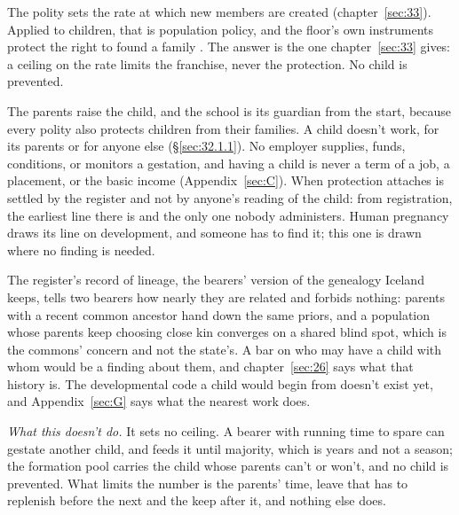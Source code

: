 The polity sets the rate at which new members are created (chapter~\ref{sec:33}). Applied to children, that is population policy, and the floor's own instruments protect the right to found a family \autocite[art.~16]{un1948udhr}. The answer is the one chapter~\ref{sec:33} gives: a ceiling on the rate limits the franchise, never the protection. No child is prevented.

The parents raise the child, and the school is its guardian from the start, because every polity also protects children from their families. A child doesn't work, for its parents or for anyone else (\S\ref{sec:32.1.1}). No employer supplies, funds, conditions, or monitors a gestation, and having a child is never a term of a job, a placement, or the basic income (Appendix~\ref{sec:C}).
When protection attaches is settled by the register and not by anyone's reading of the child: from registration, the earliest line there is and the only one nobody administers. Human pregnancy draws its line on development, and someone has to find it; this one is drawn where no finding is needed.

The register's record of lineage, the bearers' version of the genealogy Iceland keeps, tells two bearers how nearly they are related and forbids nothing: parents with a recent common ancestor hand down the same priors, and a population whose parents keep choosing close kin converges on a shared blind spot, which is the commons' concern and not the state's. A bar on who may have a child with whom would be a finding about them, and chapter~\ref{sec:26} says what that history is. The developmental code a child would begin from doesn't exist yet, and Appendix~\ref{sec:G} says what the nearest work does.

\emph{What this doesn't do.} It sets no ceiling. A bearer with running time to spare can gestate another child, and feeds it until majority, which is years and not a season; the formation pool carries the child whose parents can't or won't, and no child is prevented. What limits the number is the parents' time, leave that has to replenish before the next and the keep after it, and nothing else does.

